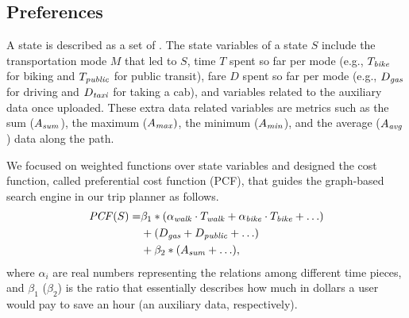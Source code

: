 \subsection{Preferences}

A state is described as a set of .
The state variables of a state $S$ include the transportation mode $M$ that led to $S$,
time $T$ spent so far per mode (e.g., $T_{\mathit{bike}}$ for biking and $T_{\mathit{public}}$ for
public transit), fare $D$ spent so far per mode (e.g., $D_{\mathit{gas}}$ for driving and
$D_{\mathit{taxi}}$ for taking a cab), and variables related to the auxiliary data once uploaded.
These extra data related variables are metrics such as the sum ($A_{\mathit{sum}}$),
the maximum ($A_{\mathit{max}})$, the minimum ($A_{\mathit{min}}$), and the average ($A_{\mathit{avg}}$) data along the path.

We focused on weighted functions over state variables and
designed the cost function, called preferential cost function (PCF), that guides the
graph-based search engine in our trip planner as follows.
\begin{equation}
	\begin{aligned}
		\mathit{PCF}(S) =& \beta_1 * (\alpha_{\mathit{walk}} \cdot T_{\mathit{walk}} + \alpha_{\mathit{bike}} \cdot T_{\mathit{bike}} + \ldots) \\
								&+ (D_{\mathit{gas}} + D_{\mathit{public}} + \ldots) \\
								&+ \beta_2 * (A_{\mathit{sum}} + \ldots),
	\end{aligned}
	\label{eqt:pcf}
\end{equation}
where $\alpha_i$ are real numbers representing the relations among different time pieces,
and $\beta_1$ ($\beta_2$) is the ratio that essentially describes how much in dollars a user would pay to
save an hour (an auxiliary data, respectively).

